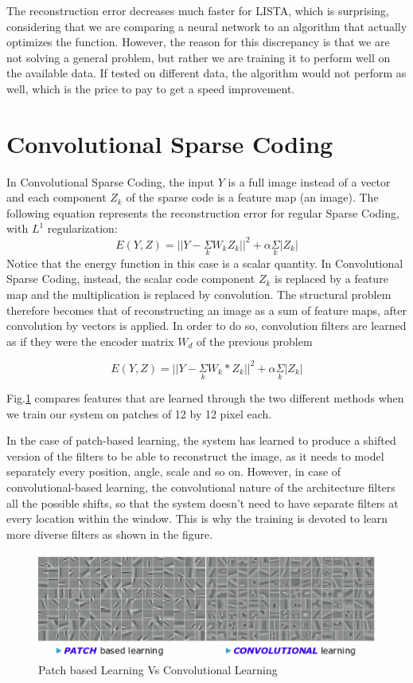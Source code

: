 The reconstruction error decreases much faster for LISTA, which is surprising, considering that we are comparing a neural network to an algorithm that actually optimizes the function. However, the reason for this discrepancy is that we are not solving a general problem, but rather we are training it to perform well on the available data. If tested on different data, the algorithm would not perform as well, which is the price to pay to get a speed improvement. 

\section{Convolutional Sparse Coding} 
In Convolutional Sparse Coding, the input $Y$ is a full image instead of a vector and each component $Z_k$ of the sparse code is a feature map (an image). The following equation represents the reconstruction error for regular Sparse Coding, with $L^1$ regularization:
\[E(Y,Z) = ||Y - \underset{k}{\Sigma} W_k Z_k||^2 + \alpha \underset{k}{\Sigma}|Z_k|\]
Notice that the energy function in this case is a scalar quantity. In Convolutional Sparse Coding, instead, the scalar code component $Z_k$ is replaced by a feature map and the multiplication is replaced by convolution. The structural problem therefore becomes that of reconstructing an image as a sum of feature maps, after convolution by vectors is applied. In order to do so, convolution filters are learned as if they were the encoder matrix $W_d$ of the previous problem

\[E(Y,Z) = ||Y - \underset{k}{\Sigma} W_k * Z_k||^2 + \alpha \underset{k}{\Sigma}|Z_k|\]

Fig.\ref{fig:PATCHvCONV} compares features that are learned through the two different methods when we train our system on patches of 12 by 12 pixel each.

In the case of patch-based learning, the system has learned to produce a shifted version of the filters to be able to reconstruct the image, as it needs to model separately every position, angle, scale and so on. However, in case of convolutional-based learning, the convolutional nature of the architecture filters all the possible shifts, so that the system doesn't need to have separate filters at every location within the window. This is why the training is devoted to learn more diverse filters as shown in the figure.

\begin{figure}[H]
  \includegraphics[width=\linewidth]{lectures/12-a/PATCHvCONV.jpg}
  \caption{Patch based Learning Vs Convolutional Learning}
  \label{fig:PATCHvCONV}
\end{figure}

